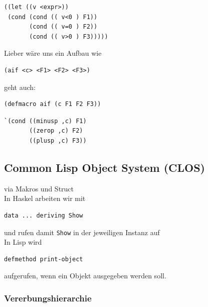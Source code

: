	\begin{lstlisting}
((let ((v <expr>))
 (cond (cond (( v<0 ) F1))
       (cond (( v=0 ) F2))
       (cond (( v>0 ) F3)))))
	\end{lstlisting}

	Lieber wäre uns ein Aufbau wie

	\lstLisp
	\begin{lstlisting}
(aif <c> <F1> <F2> <F3>)
	\end{lstlisting}

	geht auch:

	\lstLisp
	\begin{lstlisting}
(defmacro aif (c F1 F2 F3))
	\end{lstlisting}

	\lstLisp
	\begin{lstlisting}
`(cond ((minusp ,c) F1)
       ((zerop ,c) F2)
       ((plusp ,c) F3))
	\end{lstlisting}




\subsection{Common Lisp Object System (CLOS)} %
\label{sub:common_lisp_object_system_}
	
	\begin{figure}[H]
	\end{figure}
	via Makros und Struct\\

	In Haskel arbeiten wir mit 
	\lstHaskell
	\begin{lstlisting}
data ... deriving Show
	\end{lstlisting}
	und rufen damit \texttt{Show} in der jeweiligen Instanz auf\\

	In Lisp wird
	\lstLisp
	\begin{lstlisting}
defmethod print-object
	\end{lstlisting}
	aufgerufen, wenn ein Objekt ausgegeben werden soll.

	\subsubsection*{Vererbungshierarchie} %
	\label{ssub:vererbungshierarchie}
		
